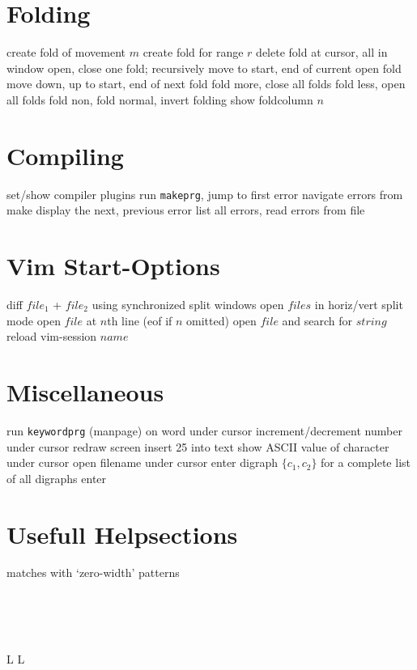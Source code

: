 \section{Folding}	{}
	{create fold of movement $m$}
	{create fold for range $r$}
	{delete fold at cursor, all in window}
	{open, close one fold; recursively}
	{move to start, end of current open fold}
	{move down, up to start, end of next fold}
	{fold more, close all folds}
	{fold less, open all folds}
	{fold non, fold normal, invert folding}
	{show foldcolumn $n$}

\section{Compiling}	{}
	{set/show compiler plugins}
	{run {\tt makeprg}, jump to first error}
	{navigate errors from make}
	{display the next, previous error}
	{list all errors, read errors from file}

\section{Vim Start-Options}	{}
	{diff $file_1$ + $file_2$ using synchronized split windows}
	{open $files$ in horiz/vert split mode}
	{open $file$ at $n$th line (eof if $n$ omitted)}
	{open $file$ and search for $string$ }
	{reload vim-session $name$}

\section{Miscellaneous}	{}
	{run {\tt keywordprg} (manpage) on word under cursor}
	{increment/decrement number under cursor}
	{redraw screen}
	{insert 25 into text}
	{show A{\smallrm SCII} value of character under cursor}
	{open filename under cursor}
	{enter digraph $\{c_1,c_2\}$}
	{for a complete list of all digraphs enter}

\section{Usefull Helpsections}	{}
	{matches with `zero-width'  patterns}


\\\\\\
\copyrightnotice


\vfil
\supereject
\if L\lr \else\null\vfill\eject\fi
\if L\lr \else\null\vfill\eject\fi
\bye

